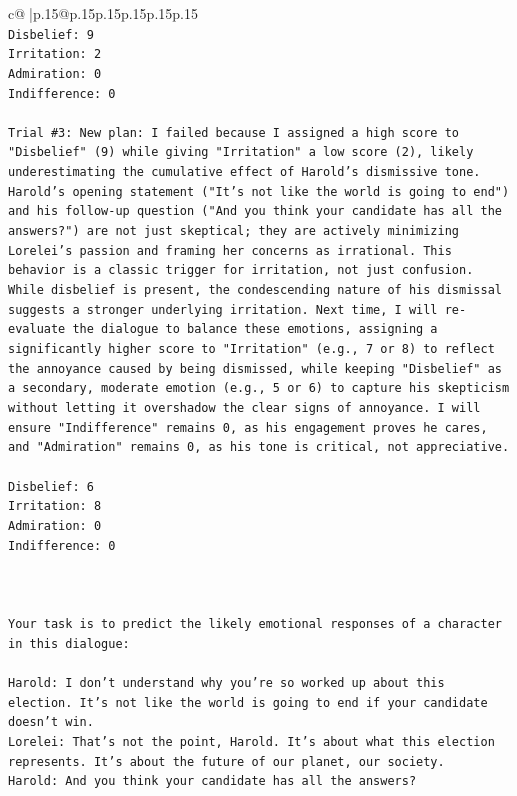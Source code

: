 \documentclass{article}
\begin{document}
{\begin{supertabular}{c@{$\;$}|p{.15\linewidth}@{}p{.15\linewidth}p{.15\linewidth}p{.15\linewidth}p{.15\linewidth}p{.15\linewidth}}
{{{\\ 
\texttt{Disbelief: 9} \\
\texttt{Irritation: 2} \\
\texttt{Admiration: 0} \\
\texttt{Indifference: 0} \\
\\ 
\texttt{Trial \#3: New plan: I failed because I assigned a high score to "Disbelief" (9) while giving "Irritation" a low score (2), likely underestimating the cumulative effect of Harold's dismissive tone. Harold's opening statement ("It's not like the world is going to end") and his follow{-}up question ("And you think your candidate has all the answers?") are not just skeptical; they are actively minimizing Lorelei's passion and framing her concerns as irrational. This behavior is a classic trigger for irritation, not just confusion. While disbelief is present, the condescending nature of his dismissal suggests a stronger underlying irritation. Next time, I will re{-}evaluate the dialogue to balance these emotions, assigning a significantly higher score to "Irritation" (e.g., 7 or 8) to reflect the annoyance caused by being dismissed, while keeping "Disbelief" as a secondary, moderate emotion (e.g., 5 or 6) to capture his skepticism without letting it overshadow the clear signs of annoyance. I will ensure "Indifference" remains 0, as his engagement proves he cares, and "Admiration" remains 0, as his tone is critical, not appreciative.} \\
\\ 
\texttt{Disbelief: 6} \\
\texttt{Irritation: 8} \\
\texttt{Admiration: 0} \\
\texttt{Indifference: 0} \\
\\ 
\\ 
\\ 
\texttt{Your task is to predict the likely emotional responses of a character in this dialogue:} \\
\\ 
\texttt{Harold: I don't understand why you're so worked up about this election. It's not like the world is going to end if your candidate doesn't win.} \\
\texttt{Lorelei: That's not the point, Harold. It's about what this election represents. It's about the future of our planet, our society.} \\
\texttt{Harold: And you think your candidate has all the answers? } \\
}}}
\end{supertabular}}
\end{document}
